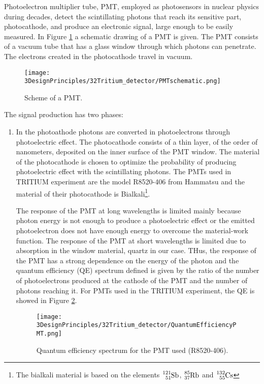Photoelectron multiplier tube, PMT, employed as photosensors in nuclear physics during decades, detect the scintillating photons that reach its sensitive part, photocathode, and produce an electronic signal, large enough to be easily measured. In Figure \ref{fig:SchemePMT} a schematic drawing of a PMT is given. The PMT consists of a vacuum tube that has a glass window through which photons can penetrate. The electrons created in the photocathode travel in vacuum. 

\begin{figure}[htbp]
\centering
\texttt{[image: 3DesignPrinciples/32Tritium\_detector/PMTschematic.png]}
\caption{Scheme of a PMT.\label{fig:SchemePMT}~\cite{Knoll}}
\end{figure}

The signal production has two phases:
\begin{enumerate}
\item{} In the photoathode photons are converted in photoelectrons through photoelectric effect. The photocathode consists of a thin layer, of the order of nanometers, deposited on the inner surface of the PMT window. The material of the photocathode is chosen to optimize the probability of producing photoelectric effect with the scintillating photons. The PMTs used in TRITIUM experiment are the model R8520-406 from Hammatsu \cite{DataSheetPMTs} and the material of their photocathode is Bialkali\footnote{The bialkali material is based on the elements $\ce{^{121}_{51}Sb}$, $\ce{^{85}_{37}Rb}$ and $\ce{^{132}_{55}Cs}$}.

The response of the PMT at long wavelengths is limited mainly because photon energy is not enough to produce a photoelectric effect or the emitted photoelectron does not have enough energy to overcome the material-work function. The response of the PMT at short wavelengths is limited due to absorption in the window material, quartz in our case. THus, the response of the PMT has a strong dependence on the energy of the photon and the quantum efficiency (QE)  spectrum defined is given by the ratio of the number of photoelectrons produced at the cathode of the PMT and the number of photons reaching it. For PMTs used in the TRITIUM experiment, the QE is showed in Figure \ref{fig:QuantumEfficiencyPMT}.

\begin{figure}[htbp]
\centering
\texttt{[image: 3DesignPrinciples/32Tritium\_detector/QuantumEfficiencyPMT.png]}
\caption{Quantum efficiency spectrum for the PMT used (R8520-406).\label{fig:QuantumEfficiencyPMT}~\cite{DataSheetPMTs}}
\end{figure}


\end{enumerate}
